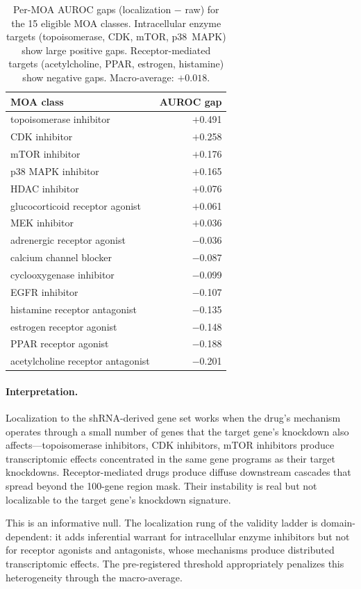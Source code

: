 \documentclass{article}
\begin{document}
\begin{table}[t]
\centering
\caption{Per-MOA AUROC gaps (localization $-$ raw) for the 15 eligible MOA
classes. Intracellular enzyme targets (topoisomerase, CDK, mTOR, p38~MAPK)
show large positive gaps. Receptor-mediated targets (acetylcholine, PPAR,
estrogen, histamine) show negative gaps. Macro-average: $+0.018$.}
\label{tab:loc_moa}
\small
\begin{tabular}{lr}
\toprule
MOA class & AUROC gap \\
\midrule
topoisomerase inhibitor & $+$0.491 \\
CDK inhibitor & $+$0.258 \\
mTOR inhibitor & $+$0.176 \\
p38 MAPK inhibitor & $+$0.165 \\
HDAC inhibitor & $+$0.076 \\
glucocorticoid receptor agonist & $+$0.061 \\
MEK inhibitor & $+$0.036 \\
\midrule
adrenergic receptor agonist & $-$0.036 \\
calcium channel blocker & $-$0.087 \\
cyclooxygenase inhibitor & $-$0.099 \\
EGFR inhibitor & $-$0.107 \\
histamine receptor antagonist & $-$0.135 \\
estrogen receptor agonist & $-$0.148 \\
PPAR receptor agonist & $-$0.188 \\
acetylcholine receptor antagonist & $-$0.201 \\
\bottomrule
\end{tabular}
\end{table}

\paragraph{Interpretation.}
Localization to the shRNA-derived gene set works when the drug's mechanism
operates through a small number of genes that the target gene's knockdown
also affects---topoisomerase inhibitors, CDK inhibitors, mTOR inhibitors
produce transcriptomic effects concentrated in the same gene programs as
their target knockdowns. Receptor-mediated drugs produce diffuse downstream
cascades that spread beyond the 100-gene region mask. Their instability is
real but not localizable to the target gene's knockdown signature.

This is an informative null. The localization rung of the validity ladder
is domain-dependent: it adds inferential warrant for intracellular enzyme
inhibitors but not for receptor agonists and antagonists, whose mechanisms
produce distributed transcriptomic effects. The pre-registered threshold
appropriately penalizes this heterogeneity through the macro-average.
\end{document}
